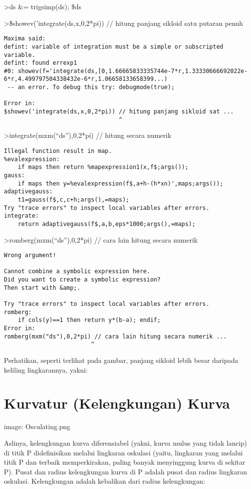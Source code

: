 \documentclass[
]{book}
\begin{document}
\textgreater ds \&= trigsimp(ds); \$ds

\textgreater\$showev('integrate(ds,x,0,2*pi)) // hitung panjang sikloid satu putaran penuh

\begin{verbatim}
Maxima said:
defint: variable of integration must be a simple or subscripted variable.
defint: found errexp1
#0: showev(f='integrate(ds,[0,1.66665833335744e-7*r,1.33330666692022e-6*r,4.499797504338432e-6*r,1.06658133658399...)
 -- an error. To debug this try: debugmode(true);

Error in:
$showev('integrate(ds,x,0,2*pi)) // hitung panjang sikloid sat ...
                                 ^
\end{verbatim}

\textgreater integrate(mxm(``ds''),0,2*pi) // hitung secara numerik

\begin{verbatim}
Illegal function result in map.
%evalexpression:
    if maps then return %mapexpression1(x,f$;args());
gauss:
    if maps then y=%evalexpression(f$,a+h-(h*xn)',maps;args());
adaptivegauss:
    t1=gauss(f$,c,c+h;args(),=maps);
Try "trace errors" to inspect local variables after errors.
integrate:
    return adaptivegauss(f$,a,b,eps*1000;args(),=maps);
\end{verbatim}

\textgreater romberg(mxm(``ds''),0,2*pi) // cara lain hitung secara numerik

\begin{verbatim}
Wrong argument!

Cannot combine a symbolic expression here.
Did you want to create a symbolic expression?
Then start with &amp;.

Try "trace errors" to inspect local variables after errors.
romberg:
    if cols(y)==1 then return y*(b-a); endif;
Error in:
romberg(mxm("ds"),0,2*pi) // cara lain hitung secara numerik ...
                         ^
\end{verbatim}

Perhatikan, seperti terlihat pada gambar, panjang sikloid lebih besar daripada keliling lingkarannya, yakni:

\section{Kurvatur (Kelengkungan) Kurva}\label{kurvatur-kelengkungan-kurva}

image: Osculating.png

Aslinya, kelengkungan kurva diferensiabel (yakni, kurva mulus yang tidak lancip) di titik P didefinisikan melalui lingkaran oskulasi (yaitu, lingkaran yang melalui titik P dan terbaik memperkirakan, paling banyak menyinggung kurva di sekitar P). Pusat dan radius kelengkungan kurva di P adalah pusat dan radius lingkaran oskulasi. Kelengkungan adalah kebalikan dari radius kelengkungan:
\end{document}
